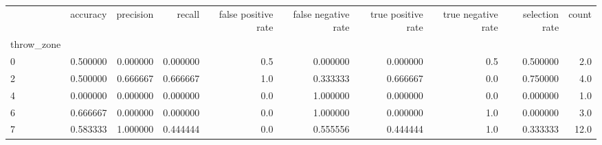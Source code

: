 \begin{tabular}{lrrrrrrrrr}
\toprule
{} &  accuracy &  precision &    recall &  false positive rate &  false negative rate &  true positive rate &  true negative rate &  selection rate &  count \\
throw\_zone &           &            &           &                      &                      &                     &                     &                 &        \\
\midrule
0          &  0.500000 &   0.000000 &  0.000000 &                  0.5 &             0.000000 &            0.000000 &                 0.5 &        0.500000 &    2.0 \\
2          &  0.500000 &   0.666667 &  0.666667 &                  1.0 &             0.333333 &            0.666667 &                 0.0 &        0.750000 &    4.0 \\
4          &  0.000000 &   0.000000 &  0.000000 &                  0.0 &             1.000000 &            0.000000 &                 0.0 &        0.000000 &    1.0 \\
6          &  0.666667 &   0.000000 &  0.000000 &                  0.0 &             1.000000 &            0.000000 &                 1.0 &        0.000000 &    3.0 \\
7          &  0.583333 &   1.000000 &  0.444444 &                  0.0 &             0.555556 &            0.444444 &                 1.0 &        0.333333 &   12.0 \\
\bottomrule
\end{tabular}
